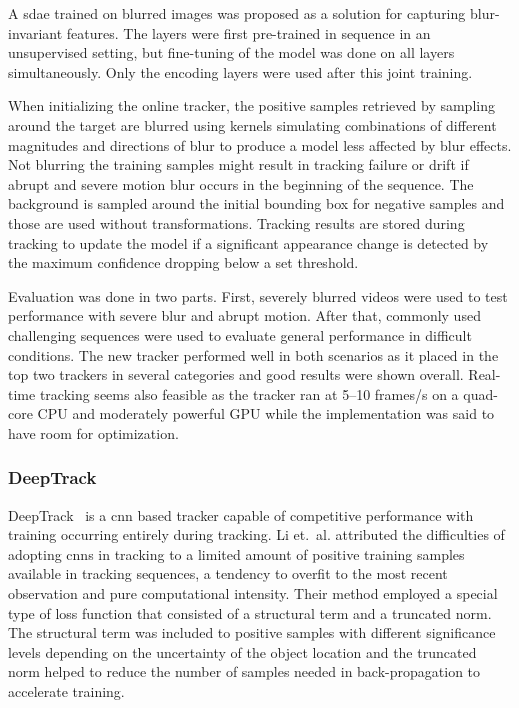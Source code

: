 A \ac{sdae} trained on blurred images was proposed as a solution for capturing blur-invariant features. The layers were first pre-trained in sequence in an unsupervised setting, but fine-tuning of the model was done on all layers simultaneously. Only the encoding layers were used after this joint training.~\cite{BLUR_TRACK}

When initializing the online tracker, the positive samples retrieved by sampling around the target are blurred using kernels simulating combinations of different magnitudes and directions of blur to produce a model less affected by blur effects. Not blurring the training samples might result in tracking failure or drift if abrupt and severe motion blur occurs in the beginning of the sequence. The background is sampled around the initial bounding box for negative samples and those are used without transformations. Tracking results are stored during tracking to update the model if a significant appearance change is detected by the maximum confidence dropping below a set threshold.~\cite{BLUR_TRACK}

Evaluation was done in two parts. First, severely blurred videos were used to test performance with severe blur and abrupt motion. After that, commonly used challenging sequences were used to evaluate general performance in difficult conditions. The new tracker performed well in both scenarios as it placed in the top two trackers in several categories and good results were shown overall. Real-time tracking seems also feasible as the tracker ran at 5--10 frames/s on a quad-core CPU and moderately powerful GPU while the implementation was said to have room for optimization.~\cite{BLUR_TRACK}

\subsubsection{DeepTrack}\label{sssec:deeptrack}
DeepTrack~\cite{DEEPTRACK} is a \ac{cnn} based tracker capable of competitive performance with training occurring entirely during tracking. Li et.~al. attributed the difficulties of adopting \ac{cnn}s in tracking to a limited amount of positive training samples available in tracking sequences, a tendency to overfit to the most recent observation and pure computational intensity. Their method employed a special type of loss function that consisted of a structural term and a truncated norm. The structural term was included to positive samples with different significance levels depending on the uncertainty of the object location and the truncated norm helped to reduce the number of samples needed in back-propagation to accelerate training.~\cite{DEEPTRACK}

